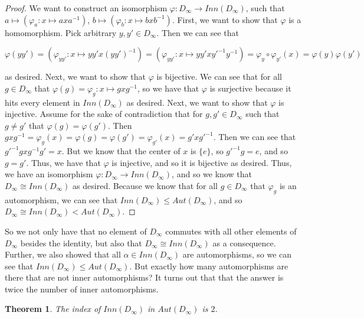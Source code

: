 \documentclass{article}
\newtheorem{theorem}{Theorem}
\theoremstyle{definition}
\begin{document}
\begin{proof}
We want to construct an isomorphism $\varphi: D_\infty \rightarrow Inn(D_\infty)$, such that $a \mapsto (\varphi_a: x \mapsto axa^{-1})$, $b \mapsto (\varphi_b: x \mapsto bxb^{-1})$. First, we want to show that $\varphi$ is a homomorphism. Pick arbitrary $y,y' \in D_\infty$. Then we can see that 
\begin{center}
    $\varphi(yy') = (\varphi_{yy'}: x \mapsto yy'x(yy')^{-1}) = (\varphi_{yy'}: x \mapsto yy'xy'^{-1}y^{-1}) = \varphi_y \circ \varphi_{y'}(x) = \varphi(y)\varphi(y')$
\end{center}
 as desired. Next, we want to show that $\varphi$ is bijective. We can see that for all $g \in D_\infty$ that $\varphi(g) = \varphi_g: x \mapsto gxg^{-1}$, so we have that $\varphi$ is surjective because it hits every element in $Inn(D_\infty)$ as desired. Next, we want to show that $\varphi$ is injective. Assume for the sake of contradiction that for $g,g' \in D_\infty$ such that $g \neq g'$ that $\varphi(g) = \varphi(g')$. Then $gxg^{-1} = \varphi_g(x) = \varphi(g) = \varphi(g') = \varphi_{g'}(x) = g'xg'^{-1}$. Then we can see that $g'^{-1}gxg^{-1}g' = x$. But we know that the center of $x$ is $\{e\}$, so $g'^{-1}g = e$, and so $g = g'$. Thus, we have that $\varphi$ is injective, and so it is bijective as desired. Thus, we have an isomorphism  $\varphi: D_\infty \rightarrow Inn(D_\infty)$, and so we know that $D_\infty \cong Inn(D_\infty)$ as desired. Because we know that for all $g \in D_\infty$ that $\varphi_g$ is an automorphism, we can see that $Inn(D_\infty) \leq Aut(D_\infty)$, and so $D_\infty \cong Inn(D_\infty) < Aut(D_\infty)$.
\end{proof}

\noindent So we not only have that no element of $D_\infty$ commutes with all other elements of $D_\infty$ besides the identity, but also that $D_\infty \cong Inn(D_\infty)$ as a consequence. Further, we also showed that all $\alpha \in Inn(D_\infty)$ are automorphisms, so we can see that $Inn(D_\infty) \leq Aut(D_\infty)$. But exactly how many automorphisms are there that are not inner automorphisms? It turns out that that the answer is twice the number of inner automorphisms.

\begin{theorem}
    The index of $Inn(D_\infty)$ in $Aut(D_\infty)$ is $2$.
\end{theorem}
\end{document}
